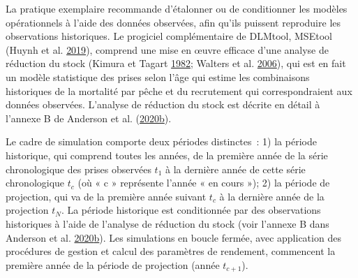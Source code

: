 \documentclass[french,11pt]{book}
\begin{document}
La pratique exemplaire recommande d'étalonner ou de conditionner les modèles opérationnels à l'aide des données observées, afin qu'ils puissent reproduire les observations historiques. Le progiciel complémentaire de DLMtool, MSEtool (Huynh et al. \protect\hyperlink{ref-huynh_msetool_2019}{2019}), comprend une mise en œuvre efficace d'une analyse de réduction du stock (Kimura et Tagart \protect\hyperlink{ref-kimura1982}{1982}; Walters et al. \protect\hyperlink{ref-walters2006}{2006}), qui est en fait un modèle statistique des prises selon l'âge qui estime les combinaisons historiques de la mortalité par pêche et du recrutement qui correspondraient aux données observées. L'analyse de réduction du stock est décrite en détail à l'annexe B de Anderson et al. (\protect\hyperlink{ref-anderson2020gfmp}{2020}\protect\hyperlink{ref-anderson2020gfmp}{b}).

Le cadre de simulation comporte deux périodes distinctes~: 1) la période historique, qui comprend toutes les années, de la première année de la série chronologique des prises observées \(t_1\) à la dernière année de cette série chronologique \(t_c\) (où « c » représente l'année « en cours »); 2) la période de projection, qui va de la première année suivant \(t_c\) à la dernière année de la projection \(t_N\). La période historique est conditionnée par des observations historiques à l'aide de l'analyse de réduction du stock (voir l'annexe B dans Anderson et al. \protect\hyperlink{ref-anderson2020gfmp}{2020}\protect\hyperlink{ref-anderson2020gfmp}{b}). Les simulations en boucle fermée, avec application des procédures de gestion et calcul des paramètres de rendement, commencent la première année de la période de projection (année \(t_{c+1}\)).
\end{document}
